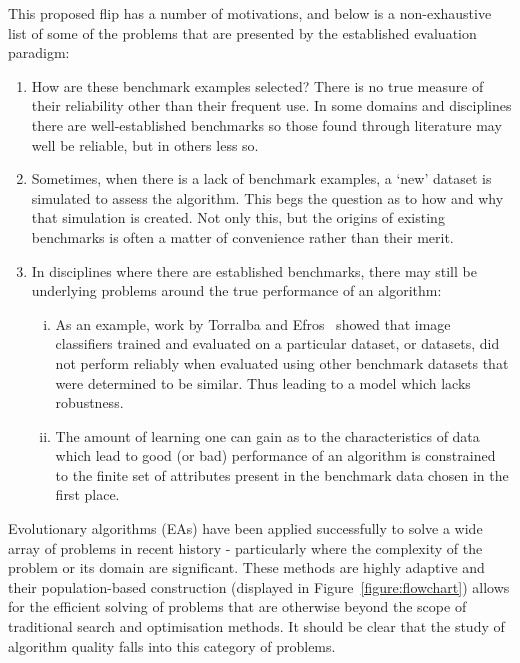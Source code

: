 This proposed flip has a number of motivations, and below is a non-exhaustive
list of some of the problems that are presented by the established evaluation
paradigm:

\begin{enumerate}
    \item How are these benchmark examples selected? There is no true measure of
        their reliability other than their frequent use. In some domains and
        disciplines there are well-established benchmarks so those found through
        literature may well be reliable, but in others less so.
    \item Sometimes, when there is a lack of benchmark examples, a `new' dataset
        is simulated to assess the algorithm. This begs the question as to how
        and why that simulation is created. Not only this, but the origins of
        existing benchmarks is often a matter of convenience rather than their
        merit.
    \item In disciplines where there are established benchmarks, there may still
        be underlying problems around the true performance of an algorithm:
        \begin{enumerate}[(i)]
            \item As an example, work by Torralba and Efros~\cite{Torralba2011}
                showed that image classifiers trained and evaluated on a
                particular dataset, or datasets, did not perform reliably when
                evaluated using other benchmark datasets that were determined
                to be similar. Thus leading to a model which lacks robustness.
            \item The amount of learning one can gain as to the characteristics
                of data which lead to good (or bad) performance of an algorithm
                is constrained to the finite set of attributes present in the
                benchmark data chosen in the first place.
        \end{enumerate}
\end{enumerate}

Evolutionary algorithms (EAs) have been applied successfully to solve a wide
array of problems in recent history \-- particularly where the complexity of the
problem or its domain are significant. These methods are highly adaptive and
their population-based construction (displayed in Figure~\ref{figure:flowchart})
allows for the efficient solving of problems that are otherwise beyond the scope
of traditional search and optimisation methods. It should be clear that the
study of algorithm quality falls into this category of problems.

